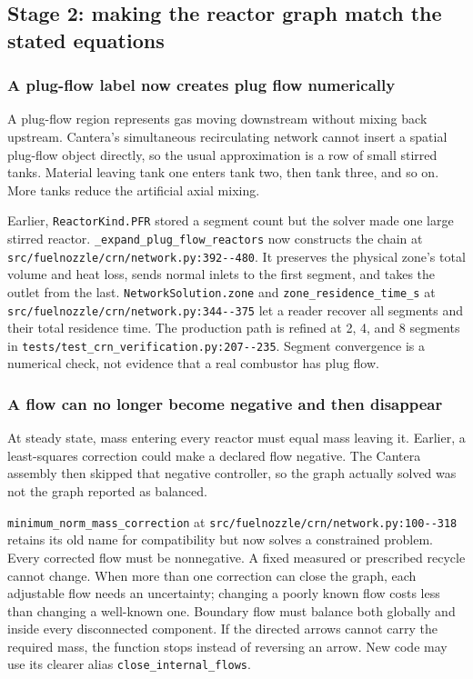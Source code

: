 \documentclass[11pt]{article}
\newcommand{\code}[1]{\nolinkurl{#1}}
\newcommand{\srcline}[2]{\nolinkurl{#1:#2}}
\begin{document}
\subsection{Stage 2: making the reactor graph match the stated equations}

\subsubsection{A plug-flow label now creates plug flow numerically}

A plug-flow region represents gas moving downstream without mixing back upstream. Cantera's
simultaneous recirculating network cannot insert a spatial plug-flow object directly, so the
usual approximation is a row of small stirred tanks. Material leaving tank one enters tank
two, then tank three, and so on. More tanks reduce the artificial axial mixing.

Earlier, \code{ReactorKind.PFR} stored a segment count but the solver made one large stirred
reactor. \code{\_expand\_plug\_flow\_reactors} now constructs the chain at
\srcline{src/fuelnozzle/crn/network.py}{392--480}. It preserves the physical zone's total
volume and heat loss, sends normal inlets to the first segment, and takes the outlet from the
last. \code{NetworkSolution.zone} and \code{zone\_residence\_time\_s} at
\srcline{src/fuelnozzle/crn/network.py}{344--375} let a reader recover all segments and their
total residence time. The production path is refined at 2, 4, and 8 segments in
\srcline{tests/test_crn_verification.py}{207--235}. Segment convergence is a numerical check,
not evidence that a real combustor has plug flow.

\subsubsection{A flow can no longer become negative and then disappear}

At steady state, mass entering every reactor must equal mass leaving it. Earlier, a
least-squares correction could make a declared flow negative. The Cantera assembly then
skipped that negative controller, so the graph actually solved was not the graph reported as
balanced.

\code{minimum\_norm\_mass\_correction} at
\srcline{src/fuelnozzle/crn/network.py}{100--318} retains its old name for compatibility but
now solves a constrained problem. Every corrected flow must be nonnegative. A fixed measured
or prescribed recycle cannot change. When more than one correction can close the graph, each
adjustable flow needs an uncertainty; changing a poorly known flow costs less than changing a
well-known one. Boundary flow must balance both globally and inside every disconnected
component. If the directed arrows cannot carry the required mass, the function stops instead
of reversing an arrow. New code may use its clearer alias \code{close\_internal\_flows}.
\end{document}
